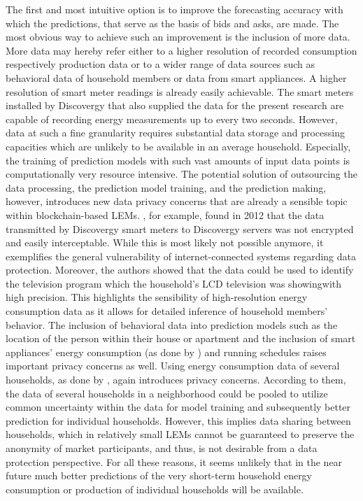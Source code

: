 The first and most intuitive option is to improve the forecasting accuracy with which the predictions, that serve as the basis of bids and asks, are made. The most obvious way to achieve such an improvement is the inclusion of more data. More data may hereby refer either to a higher resolution of recorded consumption respectively production data or to a wider range of data sources such as behavioral data of household members or data from smart appliances. A higher resolution of smart meter readings is already easily achievable. The smart meters installed by Discovergy that also supplied the data for the present research are capable of recording energy measurements up to every two seconds. However, data at such a fine granularity requires substantial data storage and processing capacities which are unlikely to be available in an average household. Especially, the training of prediction models with such vast amounts of input data points is computationally very resource intensive. The potential solution of outsourcing the data processing, the prediction model training, and the prediction making, however, introduces new data privacy concerns that are already a sensible topic within blockchain-based LEMs. \citet{Greveler:2012}, for example, found in 2012 that the data transmitted by Discovergy smart meters to Discovergy servers was not encrypted and easily interceptable. While this is most likely not possible anymore, it exemplifies the general vulnerability of internet-connected systems regarding data protection. Moreover, the authors showed that the data could be used to identify the television program which the household's LCD television was showingwith high precision. This highlights the sensibility of high-resolution energy consumption data as it allows for detailed inference of household members' behavior. The inclusion of behavioral data into prediction models such as the location of the person within their house or apartment and the inclusion of smart appliances' energy consumption (as done by \citet{Kong:2018}) and running schedules raises important privacy concerns as well. Using energy consumption data of several households, as done by \citet{Shi:2017}, again introduces privacy concerns. According to them, the data of several households in a neighborhood could be pooled to utilize common uncertainty within the data for model training and subsequently better prediction for individual households. However, this implies data sharing between households, which in relatively small LEMs cannot be guaranteed to preserve the anonymity of market participants, and thus, is not desirable from a data protection perspective. For all these reasons, it seems unlikely that in the near future much better predictions of the very short-term household energy consumption or production of individual households will be available.

